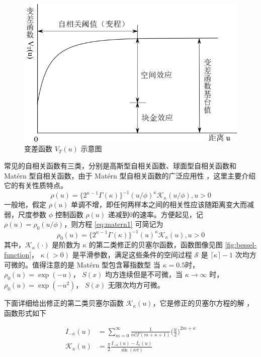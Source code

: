 \documentclass[12pt,a4paper,UTF8,twoside]{book}
\theoremstyle{definition}
\theoremstyle{definition}
\theoremstyle{definition}
\theoremstyle{remark}
\begin{document}
\begin{figure}

{\centering \includegraphics[width=0.7\linewidth]{figures/semi-variance} 

}

\caption{变差函数 $V_{T}(u)$ 示意图}\label{fig:semi-variance}
\end{figure}

常见的自相关函数有三类，分别是高斯型自相关函数、球面型自相关函数和 Matérn 型自相关函数，由于 Matérn 型自相关函数的广泛应用性 \citep{Diggle1998, Diggle2002Childhood, Christensen2004}，这里主要介绍它的有关性质特点。
\begin{equation}
\rho(u)=\{2^{\kappa -1}\Gamma(\kappa)\}^{-1}(u/\phi)^{\kappa}\mathcal{K}_{\kappa}(u/\phi),u > 0 \label{eq:matern1}
\end{equation}
\noindent 一般地，假定 \(\rho(u)\) 单调不增，即任何两样本之间的相关性应该随距离变大而减弱，尺度参数 \(\phi\) 控制函数 \(\rho(u)\) 递减到0的速率。方便起见，记 \(\rho(u) = \rho_{0}(u/\phi)\)，则方程 \eqref{eq:matern1} 可简记为
\begin{equation}
\rho_{0}(u)=\{2^{\kappa -1}\Gamma(\kappa)\}^{-1}(u)^{\kappa}\mathcal{K}_{\kappa}(u),u > 0 \label{eq:matern2}
\end{equation}
\noindent 其中，\(\mathcal{K}_{\kappa}(\cdot)\) 是阶数为 \(\kappa\) 的第二类修正的贝塞尔函数，函数图像见图 \ref{fig:bessel-function}， \(\kappa(>0)\) 是平滑参数，满足这些条件的空间过程 \(\mathcal{S}\) 是 \(\lceil\kappa\rceil-1\) 次均方可微的。值得注意的是 Matérn 型包含幂指数型
\noindent 当 \(\kappa = 0.5\)时，\(\rho_{0}(u) = \exp(-u)\)， \(S(x)\) 均方连续但是不可微，当 \(\kappa \to \infty\) 时， \(\rho_{0}(u) = \exp(-u^2)\)， \(S(x)\) 无限次均方可微\citep{Diggle2007}。

下面详细给出修正的第二类贝塞尔函数 \(\mathcal{K}_{\kappa}(u)\)，它是修正的贝塞尔方程的解 \citep{Abramowitz1972}，函数形式如下

\begin{equation}
\begin{aligned}
I_{-\kappa}(u) & =  \sum_{m=0}^{\infty} \frac{1}{m!\Gamma(m + \kappa + 1)} \big(\frac{u}{2}\big)^{2m + \kappa} \\
\mathcal{K}_{\kappa}(u) & = \frac{\pi}{2} \frac{I_{-\kappa}(u) - I_{\kappa}(u)}{\sin (\kappa \pi)}
\end{aligned} \label{eq:besselK-function}
\end{equation}
\end{document}
